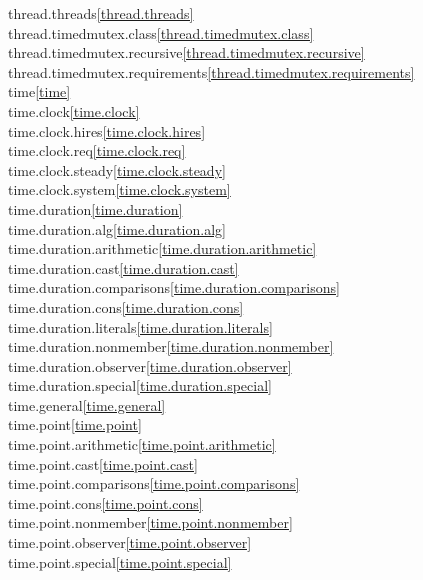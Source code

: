 \begin{multicols}{2}
thread.threads\quad\ref{thread.threads}\\
thread.timedmutex.class\quad\ref{thread.timedmutex.class}\\
thread.timedmutex.recursive\quad\ref{thread.timedmutex.recursive}\\
thread.timedmutex.requirements\quad\ref{thread.timedmutex.requirements}\\
time\quad\ref{time}\\
time.clock\quad\ref{time.clock}\\
time.clock.hires\quad\ref{time.clock.hires}\\
time.clock.req\quad\ref{time.clock.req}\\
time.clock.steady\quad\ref{time.clock.steady}\\
time.clock.system\quad\ref{time.clock.system}\\
time.duration\quad\ref{time.duration}\\
time.duration.alg\quad\ref{time.duration.alg}\\
time.duration.arithmetic\quad\ref{time.duration.arithmetic}\\
time.duration.cast\quad\ref{time.duration.cast}\\
time.duration.comparisons\quad\ref{time.duration.comparisons}\\
time.duration.cons\quad\ref{time.duration.cons}\\
time.duration.literals\quad\ref{time.duration.literals}\\
time.duration.nonmember\quad\ref{time.duration.nonmember}\\
time.duration.observer\quad\ref{time.duration.observer}\\
time.duration.special\quad\ref{time.duration.special}\\
time.general\quad\ref{time.general}\\
time.point\quad\ref{time.point}\\
time.point.arithmetic\quad\ref{time.point.arithmetic}\\
time.point.cast\quad\ref{time.point.cast}\\
time.point.comparisons\quad\ref{time.point.comparisons}\\
time.point.cons\quad\ref{time.point.cons}\\
time.point.nonmember\quad\ref{time.point.nonmember}\\
time.point.observer\quad\ref{time.point.observer}\\
time.point.special\quad\ref{time.point.special}\\

\end{multicols}
